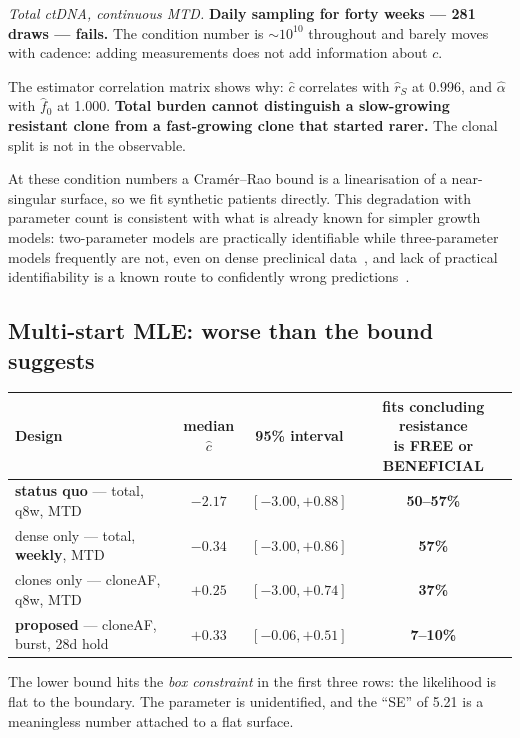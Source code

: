 \documentclass[11pt,a4paper]{article}
\newcommand{\chat}{\hat{c}}
\begin{document}
\emph{Total ctDNA, continuous MTD.} \textbf{Daily sampling for forty weeks --- 281
draws --- fails.} The condition number is ${\sim}10^{10}$ throughout and barely
moves with cadence: adding measurements does not add information about $c$.

The estimator correlation matrix shows why: $\chat$ correlates with $\hat{r}_S$ at
0.996, and $\hat{\alpha}$ with $\hat{f}_0$ at 1.000. \textbf{Total burden cannot
distinguish a slow-growing resistant clone from a fast-growing clone that started
rarer.} The clonal split is not in the observable.

At these condition numbers a Cram\'er--Rao bound is a linearisation of a
near-singular surface, so we fit synthetic patients directly. This degradation with
parameter count is consistent with what is already known for simpler growth models:
two-parameter models are practically identifiable while three-parameter models
frequently are not, even on dense preclinical
data~\citep{simpson2022parameter,porthiyas2024practical}, and lack of practical
identifiability is a known route to confidently wrong
predictions~\citep{gallo2022lack}.

\subsection{Multi-start MLE: worse than the bound suggests}

\begin{center}
\small
\begin{tabular}{lccc}
\toprule
\textbf{Design} & \textbf{median $\chat$} & \textbf{95\% interval} & \shortstack{\textbf{fits concluding resistance}\\\textbf{is FREE or BENEFICIAL}}\\
\midrule
\textbf{status quo} --- total, q8w, MTD & $\mathbf{-2.17}$ & $[-3.00, +0.88]$ & \textbf{50--57\%}\\
dense only --- total, \textbf{weekly}, MTD & $-0.34$ & $[-3.00, +0.86]$ & \textbf{57\%}\\
clones only --- cloneAF, q8w, MTD & $+0.25$ & $[-3.00, +0.74]$ & \textbf{37\%}\\
\textbf{proposed} --- cloneAF, burst, 28d hold & $\mathbf{+0.33}$ & $[-0.06, +0.51]$ & \textbf{7--10\%}\\
\bottomrule
\end{tabular}
\end{center}

The lower bound hits the \emph{box constraint} in the first three rows: the
likelihood is flat to the boundary. The parameter is unidentified, and the ``SE''
of 5.21 is a meaningless number attached to a flat surface.
\end{document}
